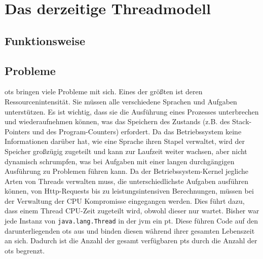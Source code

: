 \chapter{Das derzeitige Threadmodell}
\label{cha:DasDerzeitigeThreadmodell}                       %

\section{Funktionsweise}                                         
\label{sec:Funktionsweise}

\section{Probleme}                                         
\label{sec:Probleme}

\Glspl{ot} bringen viele Probleme mit sich. Eines der größten ist deren Ressourcenintensität.
Sie müssen alle verschiedene Sprachen und Aufgaben unterstützen. Es ist wichtig, dass sie die Ausführung eines Prozesses unterbrechen und
wiederaufnehmen können, 
was das Speichern des Zustands (z.B. des Stack-Pointers und des Program-Counters) erfordert. Da das Betriebssystem keine Informationen darüber hat, wie
eine Sprache ihren Stapel verwaltet, wird der Speicher großzügig zugeteilt und kann zur Laufzeit weiter wachsen, aber nicht dynamisch schrumpfen,
was bei Aufgaben mit einer langen durchgängigen Ausführung zu Problemen führen kann. Da der Betriebssystem-Kernel jegliche Arten von Threads verwalten muss,
die unterschiedlichste Aufgaben ausführen können, von Http-Requests bis zu leistungsintensiven Berechnungen, müssen bei der
Verwaltung der CPU Kompromisse eingegangen werden. Dies führt dazu, dass einem Thread CPU-Zeit zugeteilt wird, obwohl dieser nur wartet. \cite{ProjectLoom}
Bisher war jede Instanz von \texttt{java.lang.Thread} in der \gls{jvm} ein \gls{pt}. Diese führen Code auf den darunterliegenden \Glspl{ot} aus und binden diesen
während ihrer gesamten Lebenszeit an sich. Dadurch ist die Anzahl der gesamt verfügbaren \Glspl{pt} durch die Anzahl der \Glspl{ot} begrenzt. \cite{JEP425}
